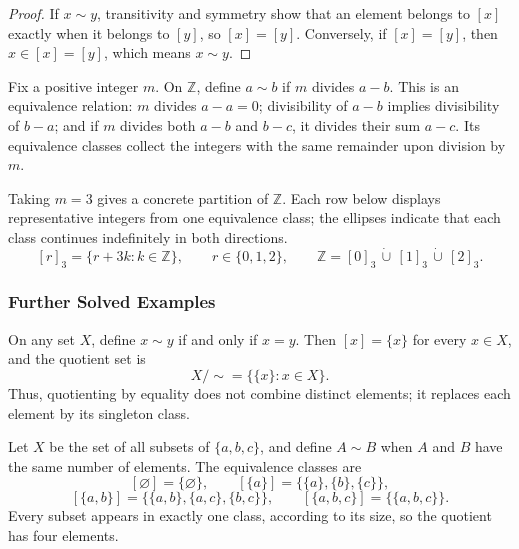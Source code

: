 \begin{proof}
If $x\sim y$, transitivity and symmetry show that an element belongs to $[x]$ exactly when it belongs to $[y]$, so $[x]=[y]$. Conversely, if $[x]=[y]$, then $x\in[x]=[y]$, which means $x\sim y$.
\end{proof}

\begin{example}
Fix a positive integer $m$. On $\mathbb{Z}$, define $a\sim b$ if $m$ divides $a-b$. This is an equivalence relation: $m$ divides $a-a=0$; divisibility of $a-b$ implies divisibility of $b-a$; and if $m$ divides both $a-b$ and $b-c$, it divides their sum $a-c$. Its equivalence classes collect the integers with the same remainder upon division by $m$.
\end{example}
Taking $m=3$ gives a concrete partition of $\mathbb{Z}$. Each row below displays representative integers from one equivalence class; the ellipses indicate that each class continues indefinitely in both directions.
\[
 [r]_3=\{r+3k:k\in\mathbb{Z}\},\qquad r\in\{0,1,2\},
 \qquad
 \mathbb{Z}=[0]_3\,\dot\cup\,[1]_3\,\dot\cup\,[2]_3.
\]



\subsubsection{Further Solved Examples}

\begin{example}
On any set $X$, define $x\sim y$ if and only if $x=y$. Then $[x]=\{x\}$ for every $x\in X$, and the quotient set is
\[
  X/{\sim}=\{\{x\}:x\in X\}.
\]
Thus, quotienting by equality does not combine distinct elements; it replaces each element by its singleton class.
\end{example}

\begin{example}
Let $X$ be the set of all subsets of $\{a,b,c\}$, and define $A\sim B$ when $A$ and $B$ have the same number of elements. The equivalence classes are
\[
  [\varnothing]=\{\varnothing\},\qquad
  [\{a\}]=\{\{a\},\{b\},\{c\}\},
\]
\[
  [\{a,b\}]=\{\{a,b\},\{a,c\},\{b,c\}\},\qquad
  [\{a,b,c\}]=\{\{a,b,c\}\}.
\]
Every subset appears in exactly one class, according to its size, so the quotient has four elements.
\end{example}

